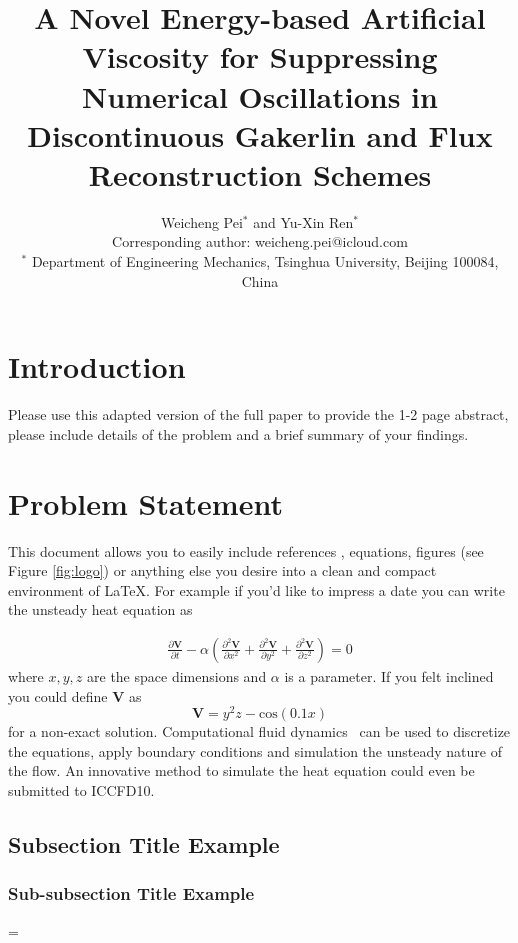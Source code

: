 \documentclass[10pt]{article}
\title{
\bf A Novel Energy-based Artificial Viscosity for Suppressing Numerical Oscillations in Discontinuous Gakerlin and Flux Reconstruction Schemes
}
\author{
Weicheng Pei$^{*}$ and Yu-Xin Ren$^{*}$\\
Corresponding author: weicheng.pei@icloud.com\\
$^{*}$ Department of Engineering Mechanics, Tsinghua University, Beijing 100084, China
}
\date{}
\newcommand{\laeq}[1]{\label{eq:#1}}
\newcommand{\figu}[1]{\ref{fig:#1}}
\newcommand{\lafi}[1]{\label{fig:#1}}
\begin{document}
\maketitle
\afterpage{\fancyhead{}}

\centerline{
}
\vskip0.5cm 

\section{Introduction}
Please use this adapted version of the full paper to provide the 1-2 page abstract, please include details of the problem and a brief summary of your findings. 


\section{Problem Statement}
This document allows you to easily include references \cite{book,journalpaper}, equations, figures (see Figure \figu{logo}) or anything else you
desire into a clean and compact environment of \LaTeX.  For example if you'd like to impress a date you can write
the unsteady heat equation as

\begin{eqnarray}
\frac{\partial \mathbf{V}}{\partial t} - \alpha \left( \frac{\partial^2 \mathbf{V}}{\partial x^2} +
       \frac{\partial^2 \mathbf{V}}{\partial y^2} +
       \frac{\partial^2 \mathbf{V}}{\partial z^2} \right)
= 0
\laeq{heat}
\end{eqnarray}
where $x, y, z$ are the space dimensions and $\alpha$ is a parameter.  If you felt inclined you could define $\mathbf{V}$ as
%
$$\mathbf{V} = y^2 z - \text{cos}(0.1 x)$$
%
for a non-exact solution.  Computational fluid dynamics~\cite{paper} can be used to discretize the equations, apply boundary conditions and 
simulation the unsteady nature of the flow.  An innovative method to simulate the heat equation could even be submitted to ICCFD10.



\subsection{Subsection Title Example}

\subsubsection{Sub-subsection Title Example}



\bibspacing=


\end{document}
